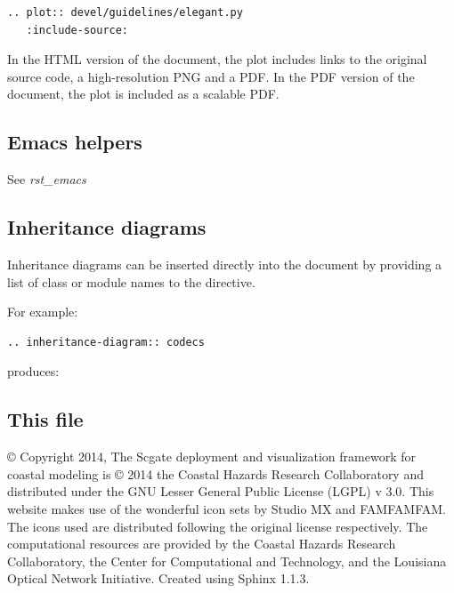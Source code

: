 \documentclass[letterpaper,10pt,openany, oneside]{sphinxmanual}
\begin{document}
\begin{Verbatim}[commandchars=\\\{\}]
.. plot:: devel/guidelines/elegant.py
   :include-source:
\end{Verbatim}

In the HTML version of the document, the plot includes links to the
original source code, a high-resolution PNG and a PDF.  In the PDF
version of the document, the plot is included as a scalable PDF.


\subsection{Emacs helpers}
\label{sample:emacs-helpers}
See \emph{rst\_emacs}


\subsection{Inheritance diagrams}
\label{sample:inheritance-diagrams}
Inheritance diagrams can be inserted directly into the document by
providing a list of class or module names to the
 directive.

For example:

\begin{Verbatim}[commandchars=\\\{\}]
.. inheritance-diagram:: codecs
\end{Verbatim}

produces:


\subsection{This file}
\label{sample:this-file}\label{sample:sphinx-literal}
© Copyright 2014, The Scgate deployment and visualization framework for coastal modeling is © 2014 the Coastal Hazards Research Collaboratory and distributed under the GNU Lesser General Public License (LGPL) v 3.0. This website makes use of the wonderful icon sets by Studio MX and FAMFAMFAM. The icons used are distributed following the original license respectively. The computational resources are provided by the Coastal Hazards Research Collaboratory, the Center for Computational and Technology, and the Louisiana Optical Network Initiative. Created using Sphinx 1.1.3.



\renewcommand{\indexname}{Index}
\printindex
\end{document}
